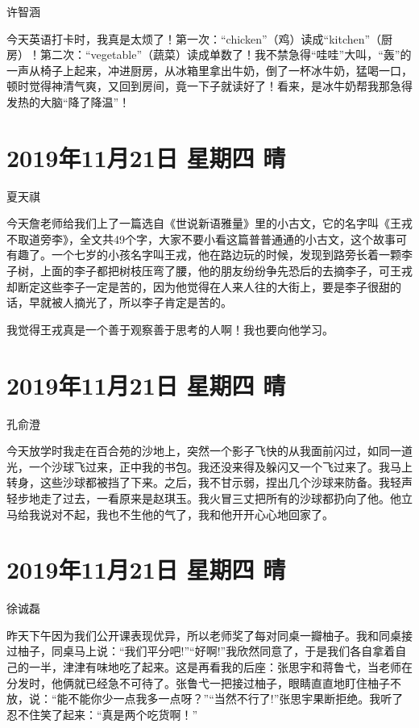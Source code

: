 许智涵

今天英语打卡时，我真是太烦了！第一次：“chicken”（鸡）读成“kitchen”（厨房）！第二次：“vegetable”（蔬菜）读成单数了！我不禁急得“哇哇”大叫，“轰”的一声从椅子上起来，冲进厨房，从冰箱里拿出牛奶，倒了一杯冰牛奶，猛喝一口，顿时觉得神清气爽，又回到房间，竟一下子就读好了！看来，是冰牛奶帮我那急得发热的大脑“降了降温”！

\section{2019年11月21日 星期四 晴}

夏天祺

今天詹老师给我们上了一篇选自《世说新语雅量》里的小古文，它的名字叫《王戎不取道旁李》，全文共49个字，大家不要小看这篇普普通通的小古文，这个故事可有趣了。一个七岁的小孩名字叫王戎，他在路边玩的时候，发现到路旁长着一颗李子树，上面的李子都把树枝压弯了腰，他的朋友纷纷争先恐后的去摘李子，可王戎却断定这些李子一定是苦的，因为他觉得在人来人往的大街上，要是李子很甜的话，早就被人摘光了，所以李子肯定是苦的。

我觉得王戎真是一个善于观察善于思考的人啊！我也要向他学习。

\section{2019年11月21日 星期四 晴}

孔俞澄

今天放学时我走在百合苑的沙地上，突然一个影子飞快的从我面前闪过，如同一道光，一个沙球飞过来，正中我的书包。我还没来得及躲闪又一个飞过来了。我马上转身，这些沙球都被挡了下来。之后，我不甘示弱，捏出几个沙球来防备。我轻声轻步地走了过去，一看原来是赵琪玉。我火冒三丈把所有的沙球都扔向了他。他立马给我说对不起，我也不生他的气了，我和他开开心心地回家了。

\section{2019年11月21日 星期四 晴}

徐诚磊

昨天下午因为我们公开课表现优异，所以老师奖了每对同桌一瓣柚子。我和同桌接过柚子，同桌马上说：“我们平分吧!”“好啊!”我欣然同意了，于是我们各自拿着自己的一半，津津有味地吃了起来。这是再看我的后座：张思宇和蒋鲁弋，当老师在分发时，他俩就已经急不可待了。张鲁弋一把接过柚子，眼睛直直地盯住柚子不放，说：“能不能你少一点我多一点呀？”“当然不行了!”张思宇果断拒绝。我听了忍不住笑了起来：“真是两个吃货啊！”

